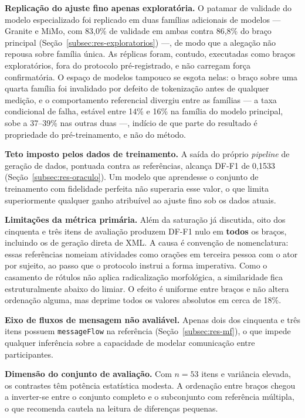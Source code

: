 \textbf{Replicação do ajuste fino apenas exploratória.} O patamar de validade do modelo especializado foi replicado em duas famílias adicionais de modelos --- Granite e MiMo, com 83,0\% de validade em ambas contra 86,8\% do braço principal (Seção~\ref{subsec:res-exploratorios}) ---, de modo que a alegação não repousa sobre família única. As réplicas foram, contudo, executadas como braços exploratórios, fora do protocolo pré-registrado, e não carregam força confirmatória. O espaço de modelos tampouco se esgota nelas: o braço sobre uma quarta família foi invalidado por defeito de tokenização antes de qualquer medição, e o comportamento referencial divergiu entre as famílias --- a taxa condicional de falha, estável entre 14\% e 16\% na família do modelo principal, sobe a 37--39\% nas outras duas ---, indício de que parte do resultado é propriedade do pré-treinamento, e não do método.

\textbf{Teto imposto pelos dados de treinamento.} A saída do próprio \textit{pipeline} de geração de dados, pontuada contra as referências, alcança DF-F1 de 0,1533 (Seção~\ref{subsec:res-oraculo}). Um modelo que aprendesse o conjunto de treinamento com fidelidade perfeita não superaria esse valor, o que limita superiormente qualquer ganho atribuível ao ajuste fino sob os dados atuais.

\textbf{Limitações da métrica primária.} Além da saturação já discutida, oito dos cinquenta e três itens de avaliação produzem DF-F1 nulo em \textbf{todos} os braços, incluindo os de geração direta de XML. A causa é convenção de nomenclatura: essas referências nomeiam atividades como orações em terceira pessoa com o ator por sujeito, ao passo que o protocolo instrui a forma imperativa. Como o casamento de rótulos não aplica radicalização morfológica, a similaridade fica estruturalmente abaixo do limiar. O efeito é uniforme entre braços e não altera ordenação alguma, mas deprime todos os valores absolutos em cerca de 18\%.

\textbf{Eixo de fluxos de mensagem não avaliável.} Apenas dois dos cinquenta e três itens possuem \texttt{messageFlow} na referência (Seção~\ref{subsec:res-mf}), o que impede qualquer inferência sobre a capacidade de modelar comunicação entre participantes.

\textbf{Dimensão do conjunto de avaliação.} Com $n = 53$ itens e variância elevada, os contrastes têm potência estatística modesta. A ordenação entre braços chegou a inverter-se entre o conjunto completo e o subconjunto com referência múltipla, o que recomenda cautela na leitura de diferenças pequenas.

